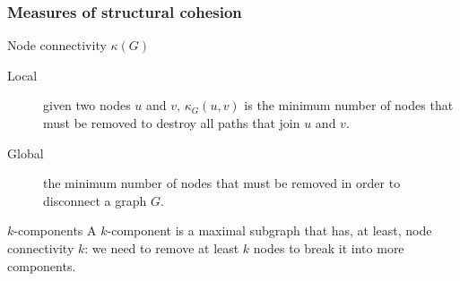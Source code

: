 \documentclass[ignorenonframetext,red,8pt]{beamer}
\begin{document}
\begin{frame}
\frametitle{Measures of structural cohesion}


\begin{block}{Node connectivity $\kappa(G)$}
\begin{description}
\item[Local] given two nodes $u$ and $v$, $\kappa_{G}(u,v)$ is the minimum number of nodes that must be removed to destroy all paths that join $u$ and $v$.

\item[Global] the minimum number of nodes that must be removed in order to disconnect a graph $G$.


\end{description}

\end{block}



\begin{block}{$k$-components}
A $k$-component is a maximal subgraph that has, at least, node connectivity $k$: we need to remove at least $k$ nodes to break it into more components. 
\end{block}


\end{frame}
\end{document}
